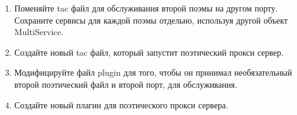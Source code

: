 \begin{enumerate}

\item Поменяйте tac файл для обслуживания второй поэмы на другом 
порту. Сохраните сервисы для каждой поэмы отдельно, используя другой 
объект MultiService.

\item Создайте новый tac файл, который запустит поэтический прокси 
сервер.

\item Модифицируйте файл plugin для того, чтобы он принимал 
необязательный второй поэтический файл и второй порт, для 
обслуживания.

\item Создайте новый плагин для поэтического прокси сервера.

\end{enumerate}




